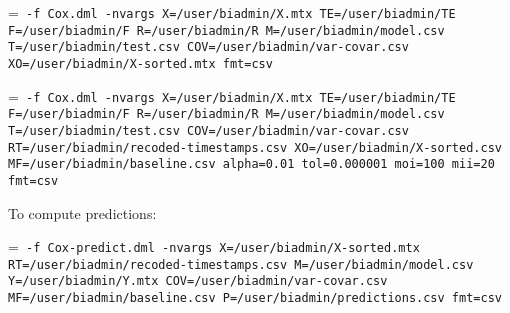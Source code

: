 \smallskip
{}
\smallskip

{\hangindent=\parindent\noindent\tt
	\hml -f Cox.dml -nvargs X=/user/biadmin/X.mtx TE=/user/biadmin/TE
	F=/user/biadmin/F R=/user/biadmin/R M=/user/biadmin/model.csv
	T=/user/biadmin/test.csv COV=/user/biadmin/var-covar.csv XO=/user/biadmin/X-sorted.mtx fmt=csv
	
}\smallskip

{\hangindent=\parindent\noindent\tt
	\hml -f Cox.dml -nvargs X=/user/biadmin/X.mtx TE=/user/biadmin/TE
	F=/user/biadmin/F R=/user/biadmin/R M=/user/biadmin/model.csv
	T=/user/biadmin/test.csv COV=/user/biadmin/var-covar.csv 
	RT=/user/biadmin/recoded-timestamps.csv XO=/user/biadmin/X-sorted.csv 
	MF=/user/biadmin/baseline.csv alpha=0.01 tol=0.000001 moi=100 mii=20 fmt=csv
	
}\smallskip

\noindent To compute predictions:

{\hangindent=\parindent\noindent\tt
	\hml -f Cox-predict.dml -nvargs X=/user/biadmin/X-sorted.mtx 
	RT=/user/biadmin/recoded-timestamps.csv
	M=/user/biadmin/model.csv Y=/user/biadmin/Y.mtx COV=/user/biadmin/var-covar.csv 
	MF=/user/biadmin/baseline.csv P=/user/biadmin/predictions.csv fmt=csv
	
}


